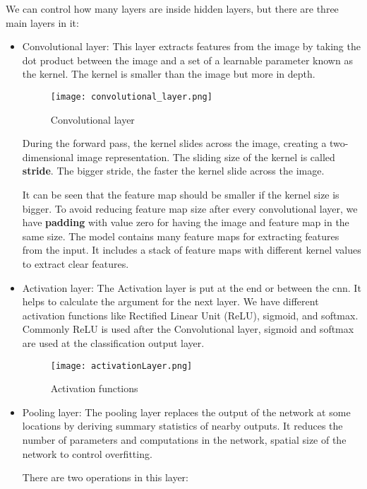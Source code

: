 We can control how many layers are inside hidden layers, but there are three main layers in it:
\begin{itemize}
    \item {Convolutional layer}: This layer extracts features from the image by taking the dot product between the image and a set of a learnable parameter known as the kernel. The kernel is smaller than the image but more in depth. 
    
    \begin{figure}[H]
        \centering
        \texttt{[image: convolutional\_layer.png]}
        \caption{Convolutional layer}
    \end{figure}
    During the forward pass, the kernel slides across the image, creating a two-dimensional image representation. The sliding size of the kernel is called \textbf{stride}. The bigger stride, the faster the kernel slide across the image.
    
    It can be seen that the feature map should be smaller if the kernel size is bigger. To avoid reducing feature map size after every convolutional layer, we have \textbf{padding} with value zero for having the image and feature map in the same size. The model contains many feature maps for extracting features from the input. It includes a stack of feature maps with different kernel values to extract clear features.
    
    \item {Activation layer}: The Activation layer is put at the end or between the \acrlong{cnn}. It helps to calculate the argument for the next layer. We have different activation functions like Rectified Linear Unit (ReLU), sigmoid, and softmax. Commonly ReLU is used after the Convolutional layer, sigmoid and softmax are used at the classification output layer.
    
    \begin{figure}[H]
        \centering
        \texttt{[image: activationLayer.png]}
        \caption{Activation functions}
    \end{figure}
    
    \item {Pooling layer}: The pooling layer replaces the output of the network at some locations by deriving summary statistics of nearby outputs. It reduces the number of parameters and computations in the network, spatial size of the network to control overfitting. 
    
    There are two operations in this layer:
    

\end{itemize}
